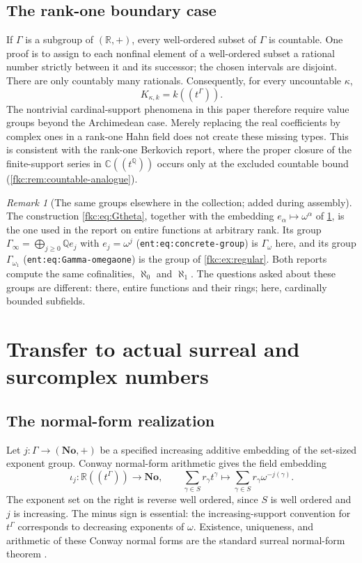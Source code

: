 \documentclass[11pt,letterpaper]{article}
\numberwithin{equation}{section}
\theoremstyle{definition}
\theoremstyle{remark}
\newtheorem{remark}[theorem]{Remark}
\newcommand{\R}{\mathbb R}
\newcommand{\C}{\mathbb C}
\newcommand{\Q}{\mathbb Q}
\newcommand{\No}{\mathbf{No}}
\begin{document}
\subsection{The rank-one boundary case}
If $\Gamma$ is a subgroup of $(\R,+)$, every well-ordered subset of $\Gamma$ is countable. One proof is to assign to each nonfinal element of a well-ordered subset a rational number strictly between it and its successor; the chosen intervals are disjoint. There are only countably many rationals. Consequently, for every uncountable $\kappa$,
\[
 K_{\kappa,k}=k((t^\Gamma)).
\]
The nontrivial cardinal-support phenomena in this paper therefore require value groups beyond the Archimedean case. Merely replacing the real coefficients by complex ones in a rank-one Hahn field does not create these missing types. This is consistent with the rank-one Berkovich report, where the proper closure of the finite-support series in $\C((t^\Q))$ occurs only at the excluded countable bound (\cref{fkc:rem:countable-analogue}).

\begin{remark}[The same groups elsewhere in the collection; added during assembly]\label{fkc:rem:groups-elsewhere}
The construction \eqref{fkc:eq:Gtheta}, together with the embedding $e_\alpha\mapsto\omega^\alpha$ of \cref{fkc:sec:surreal}, is the one used in the report on entire functions at arbitrary rank. Its group $\Gamma_\infty=\bigoplus_{j\ge0}\Q e_j$ with $e_j=\omega^j$ (\texttt{ent:eq:concrete-group}) is $\Gamma_\omega$ here, and its group $\Gamma_{\omega_1}$ (\texttt{ent:eq:Gamma-omegaone}) is the group of \cref{fkc:ex:regular}. Both reports compute the same cofinalities, $\aleph_0$ and $\aleph_1$. The questions asked about these groups are different: there, entire functions and their rings; here, cardinally bounded subfields.
\end{remark}

\section{Transfer to actual surreal and surcomplex numbers}
\label{fkc:sec:surreal}

\subsection{The normal-form realization}
Let $j:\Gamma\to(\No,+)$ be a specified increasing additive embedding of the set-sized exponent group. Conway normal-form arithmetic gives the field embedding
\begin{equation}\label{fkc:eq:conway}
 \iota_j:\R((t^\Gamma))\longrightarrow\No,\qquad
 \sum_{\gamma\in S}r_\gamma t^\gamma
 \longmapsto
 \sum_{\gamma\in S}r_\gamma\omega^{-j(\gamma)}.
\end{equation}
The exponent set on the right is reverse well ordered, since $S$ is well ordered and $j$ is increasing. The minus sign is essential: the increasing-support convention for $t^\Gamma$ corresponds to decreasing exponents of $\omega$. Existence, uniqueness, and arithmetic of these Conway normal forms are the standard surreal normal-form theorem \cite{Gonshor}.
\end{document}
